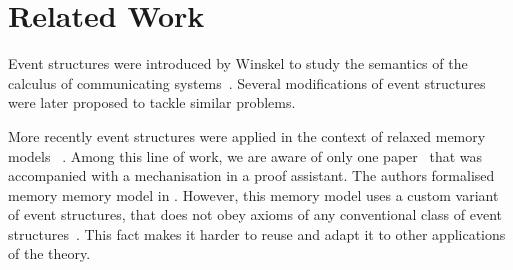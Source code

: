\section{Related Work}


Event structures were introduced by Winskel to study the semantics of 
the calculus of communicating systems~\cite{Winskel:82}. 
Several modifications of event structures~\cite{Langerak:91, Boudol-Castellani:1991}
were later proposed to tackle similar problems.  
 
More recently event structures were applied 
in the context of relaxed memory models~%
\cite{Jeffrey-Riely:LICS16, PichonPharabod-Sewell:POPL16, Chakraborty-Vafeiadis:POPL19, Moiseenko-al:ECOOP20}.
Among this line of work, we are aware of only one paper~\cite{Moiseenko-al:ECOOP20}
that was accompanied with a mechanisation in a proof assistant. 
The authors formalised \weakestmo~\cite{Chakraborty-Vafeiadis:POPL19} 
memory memory model in \coq. However, this memory model uses 
a custom variant of event structures, that does not 
obey axioms of any conventional class of 
event structures~\cite{Winskel:82, Langerak:91, Boudol-Castellani:1991}. 
This fact makes it harder to reuse and adapt it 
to other applications of the theory. 

